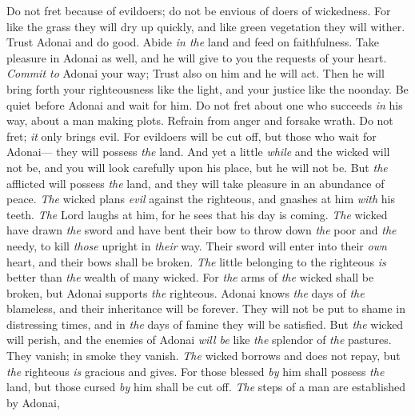\begin{biblechapter} %
 Do not fret because of evildoers; 
do not be envious of doers of wickedness.
\verse For like the grass they will dry up quickly, 
and like green vegetation they will wither.
\verse Trust Adonai and do good. 
Abide \textit{in the} land and feed on faithfulness.
\verse Take pleasure in Adonai as well, 
and he will give to you the requests of your heart.
\verse \textit{Commit to} Adonai your way; 
Trust also on him and he will act.
\verse Then he will bring forth your righteousness like the light, 
and your justice like the noonday.
\verse Be quiet before Adonai and wait for him. 
Do not fret about one who succeeds \textit{in} his way, 
about a man making plots.
\verse Refrain from anger and forsake wrath. 
Do not fret; \textit{it} only brings evil.
\verse For evildoers will be cut off, 
but those who wait for Adonai— 
they will possess \textit{the} land.
\verse And yet a little \textit{while} and the wicked will not be, 
and you will look carefully upon his place, but he will not be.
\verse But \textit{the} afflicted will possess \textit{the} land, 
and they will take pleasure in an abundance of peace.
\verse \textit{The} wicked plans \textit{evil} against the righteous, 
and gnashes at him \textit{with} his teeth.
\verse \textit{The} Lord laughs at him, 
for he sees that his day is coming.
\verse \textit{The} wicked have drawn \textit{the} sword and have bent their bow 
to throw down \textit{the} poor and \textit{the} needy, 
to kill \textit{those} upright in \textit{their} way.
\verse Their sword will enter into their \textit{own} heart, 
and their bows shall be broken.
\verse \textit{The} little belonging to the righteous \textit{is} better 
than \textit{the} wealth of many wicked.
\verse For \textit{the} arms of \textit{the} wicked shall be broken, 
but Adonai supports \textit{the} righteous.
\verse Adonai knows \textit{the} days of \textit{the} blameless, 
and their inheritance will be forever.
\verse They will not be put to shame in distressing times, 
and in \textit{the} days of famine they will be satisfied.
\verse But \textit{the} wicked will perish, 
and the enemies of Adonai \textit{will be} like \textit{the} splendor of \textit{the} pastures. 
They vanish; in smoke they vanish.
\verse \textit{The} wicked borrows and does not repay, 
but \textit{the} righteous \textit{is} gracious and gives.
\verse For those blessed \textit{by} him shall possess \textit{the} land, 
but those cursed \textit{by} him shall be cut off.
\verse \textit{The} steps of a man are established by Adonai, 

\end{biblechapter}
